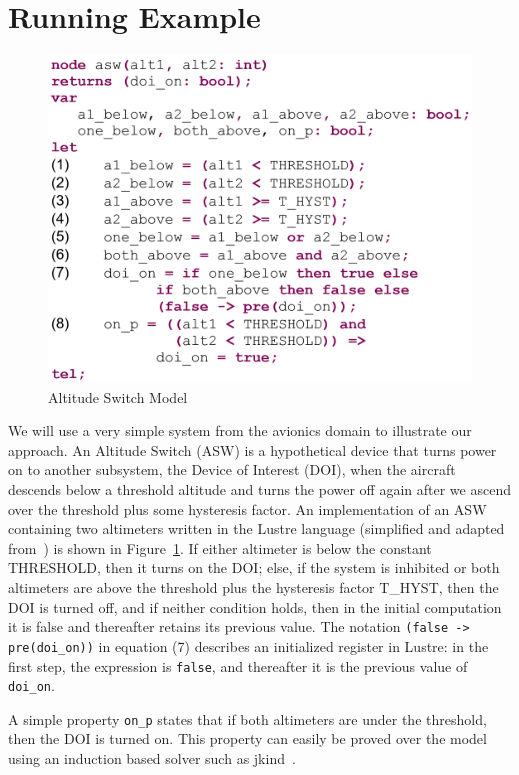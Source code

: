 \section{Running Example}
\label{sec:example}


\begin{figure}[t]
\centering
\includegraphics[width=0.6\columnwidth]{figs/aswcode.png}
\caption{Altitude Switch Model }
\label{fig:asw}
\end{figure}

We will use a very simple system from the avionics domain to illustrate our approach. An Altitude Switch (ASW) is a hypothetical device that turns power on to another subsystem, the Device of Interest (DOI), when the aircraft descends below a threshold altitude and turns the power off again after we ascend over the threshold plus some hysteresis factor.  An implementation of an ASW containing two altimeters written in the Lustre language (simplified and adapted from~\cite{HCW02:ase-deviation}) is shown in Figure~\ref{fig:asw}.  If either altimeter is below the constant THRESHOLD, then it turns on the DOI; else, if the system is inhibited or both altimeters are above the threshold plus the hysteresis factor T\_HYST, then the DOI is turned off, and if neither condition holds, then in the initial computation it is false and thereafter retains its previous value.  The notation \texttt{(false -> pre(doi\_on))} in equation (7) describes an initialized register in Lustre: in the first step, the expression is \texttt{false}, and thereafter it is the previous value of \texttt{doi\_on}.

A simple property \texttt{on\_p} states that if both altimeters are under the threshold, then the DOI is turned on.  This property can easily be proved over the model using an induction based solver such as jkind~\cite{jkind}.


